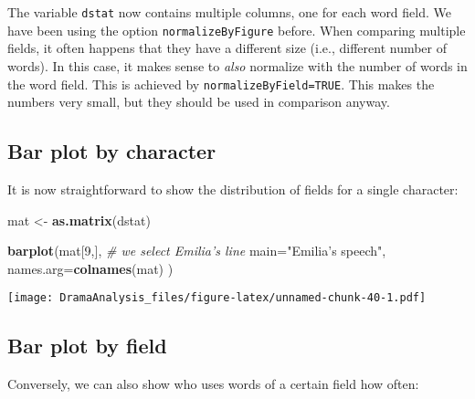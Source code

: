 \documentclass[]{book}
\newenvironment{Shaded}{\begin{snugshade}}{\end{snugshade}}
\newcommand{\CommentTok}[1]{\textcolor[rgb]{0.56,0.35,0.01}{\textit{#1}}}
\newcommand{\DataTypeTok}[1]{\textcolor[rgb]{0.13,0.29,0.53}{#1}}
\newcommand{\DecValTok}[1]{\textcolor[rgb]{0.00,0.00,0.81}{#1}}
\newcommand{\KeywordTok}[1]{\textcolor[rgb]{0.13,0.29,0.53}{\textbf{#1}}}
\newcommand{\NormalTok}[1]{#1}
\newcommand{\StringTok}[1]{\textcolor[rgb]{0.31,0.60,0.02}{#1}}
\begin{document}
The variable \texttt{dstat} now contains multiple columns, one for each word field. We have been using the option \texttt{normalizeByFigure} before. When comparing multiple fields, it often happens that they have a different size (i.e., different number of words). In this case, it makes sense to \emph{also} normalize with the number of words in the word field. This is achieved by \texttt{normalizeByField=TRUE}. This makes the numbers very small, but they should be used in comparison anyway.

\hypertarget{bar-plot-by-character}{%
\subsection{Bar plot by character}\label{bar-plot-by-character}}

It is now straightforward to show the distribution of fields for a single character:

\begin{Shaded}
\begin{Highlighting}[]
\NormalTok{mat <-}\StringTok{ }\KeywordTok{as.matrix}\NormalTok{(dstat)}

\KeywordTok{barplot}\NormalTok{(mat[}\DecValTok{9}\NormalTok{,],     }\CommentTok{# we select Emilia's line}
        \DataTypeTok{main=}\StringTok{"Emilia's speech"}\NormalTok{,}
        \DataTypeTok{names.arg=}\KeywordTok{colnames}\NormalTok{(mat)}
\NormalTok{)}
\end{Highlighting}
\end{Shaded}

\texttt{[image: DramaAnalysis\_files/figure-latex/unnamed-chunk-40-1.pdf]}

\hypertarget{bar-plot-by-field}{%
\subsection{Bar plot by field}\label{bar-plot-by-field}}

Conversely, we can also show who uses words of a certain field how often:
\end{document}
